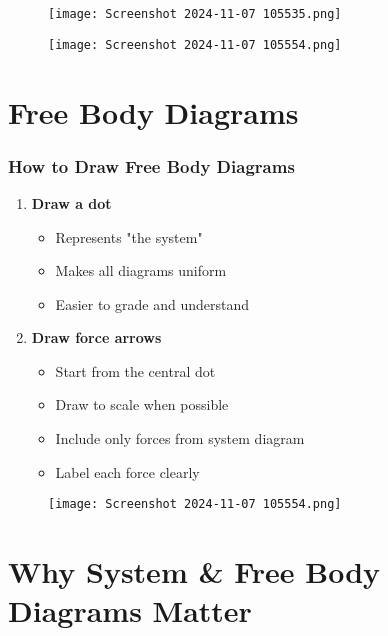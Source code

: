 \documentclass{beamer}
\begin{document}
\begin{frame}
\begin{figure}[H]
    \centering
    \texttt{[image: Screenshot 2024-11-07 105535.png]}
\end{figure}
\begin{figure}[H]
    \centering
    \texttt{[image: Screenshot 2024-11-07 105554.png]}
\end{figure}

\end{frame}

\section{Free Body Diagrams}

\begin{frame}
\frametitle{How to Draw Free Body Diagrams}
\begin{enumerate}
    \item \textbf{Draw a dot}
    \begin{itemize}
        \item Represents "the system"
        \item Makes all diagrams uniform
        \item Easier to grade and understand
    \end{itemize}
    \item \textbf{Draw force arrows}
    \begin{itemize}
        \item Start from the central dot
        \item Draw to scale when possible
        \item Include only forces from system diagram
        \item Label each force clearly
    \end{itemize}
\end{enumerate}
\begin{figure}
    \centering
    \texttt{[image: Screenshot 2024-11-07 105554.png]}
\end{figure}
\end{frame}

\section{Why System \& Free Body Diagrams Matter}
\end{document}
